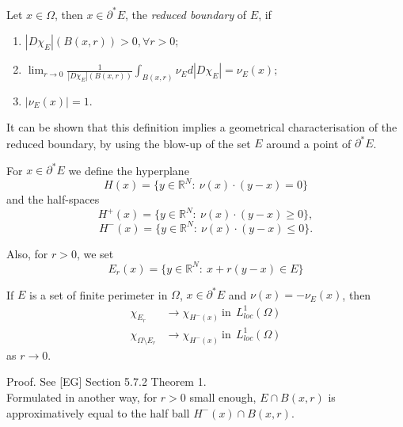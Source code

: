 \begin{definition} \label{reducedboundary} Let $x \in \Omega$, then $x \in \partial^{*}E$, the {\em reduced boundary} of $E$, if
\begin{enumerate}
	\item $|D\chi_{E}|(B(x,r)) > 0, \forall r >0;$
	\item $\lim_{r \to 0} \frac{1}{|D\chi_{E}|(B(x,r))} \int_{B(x,r)} \nu_{E} d|D\chi_{E}| = \nu_{E} (x);$
	\item $|\nu_{E}(x)| = 1.$
\end{enumerate}
\end{definition}

It can be shown that this definition implies a geometrical characterisation of the reduced boundary, by using the blow-up of the set $E$ around a point of $\partial^{*} E$.

\begin{definition} For $x \in \partial^{*}E$ we define the hyperplane
\[H(x) = \{ y \in \mathbb{R}^{N} : \ \nu(x) \cdot (y - x) = 0 \} \]
and the half-spaces
\[H^{+}(x) = \{ y \in \mathbb{R}^{N} : \ \nu(x) \cdot (y - x) \ge 0 \}, \]
\[H^{-}(x) = \{ y \in \mathbb{R}^{N} : \ \nu(x) \cdot (y - x) \le 0 \}. \]

Also, for $r > 0$, we set
\[ E_{r} (x) = \{ y \in \mathbb{R}^{N} : \ x + r(y - x) \in E \} \]
\end{definition}

\begin{theorem} \label{convblowup} If $E$ is a set of finite perimeter in $\Omega$, $x \in \partial^{*}E$ and $\nu(x) = - \nu_{E}(x)$, then
\begin{align*} \chi_{E_{r}} & \to \chi_{H^{-}(x)}  \ \mathrm{in} \ \ L^{1}_{loc}(\Omega) \\
\chi_{\Omega \setminus E_{r}} & \to \chi_{H^{-}(x)}  \ \mathrm{in} \ \ L^{1}_{loc}(\Omega) \end{align*}
as $r \to 0$.
\end{theorem}

Proof. See [EG] Section 5.7.2 Theorem 1.
\\

Formulated in another way, for $r > 0$ small enough, $E \cap B(x, r)$ is approximatively equal to the half ball $H^{-}(x) \cap B(x, r)$.

